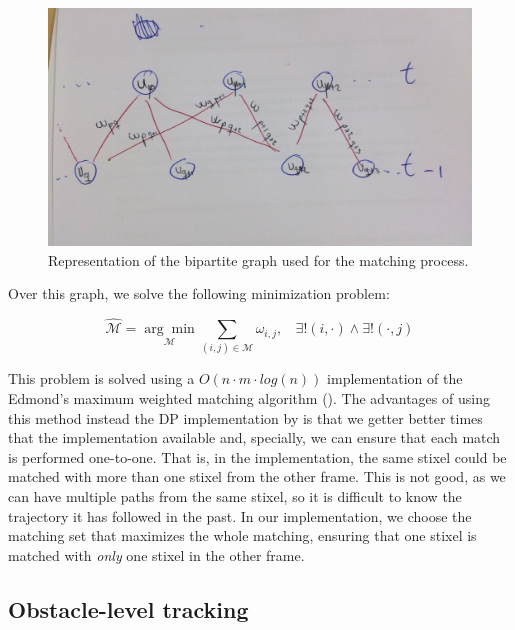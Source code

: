 \begin{figure}[h!]
\centering
\includegraphics{bipartite_graph}
\caption{Representation of the bipartite graph used for the matching process.}\label{fig:cp04_bipartite_graph}
\end{figure}

Over this graph, we solve the following minimization problem:

\begin{equation}\label{eq:cp04_match_minimization}
\mathcal{\hat{M}}=\underset{\mathcal{M}}{\arg\min} \underset{(i, j) \in \mathcal{M}}{\sum} \omega_{i,j}, 
~~~~\exists! (i, \cdot) \wedge \exists! (\cdot, j)
\end{equation}

This problem is solved using a $O(n \cdot m \cdot log(n))$ implementation of the Edmond's maximum weighted matching algorithm (\cite{edmonds1965paths}). The advantages of using this method instead the \ac{DP} implementation by \cite{gunyel2012stixels} is that we getter better times that the implementation available and, specially, we can ensure that each match is performed one-to-one. That is, in the \cite{gunyel2012stixels} implementation, the same stixel could be matched with more than one stixel from the other frame. This is not good, as we can have multiple paths from the same stixel, so it is difficult to know the trajectory it has followed in the past. In our implementation, we choose the matching set that maximizes the whole matching, ensuring that one stixel is matched with \emph{only} one stixel in the other frame.

\subsection{Obstacle-level tracking}\label{ch:chapter04_01_04}

